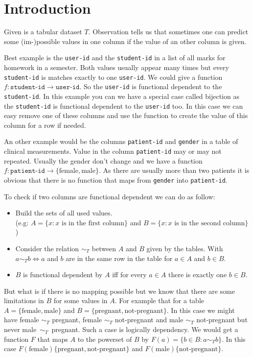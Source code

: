 \documentclass[a4paper]{article}
\begin{document}
\section{Introduction}
Given is a tabular dataset $T$.
Observation tells us that sometimes one can predict some (im-)possible values in one column if the value of an other column is given.

Best example is the \texttt{user-id} and the \texttt{student-id} in a list of all marks for homework in a semester.
Both values usually appear many times but every \texttt{student-id} is matches exactly to one \texttt{user-id}.
We could give a function $f : \texttt{student-id} \to \texttt{user-id}$.
So the \texttt{user-id} is functional dependent to the \texttt{student-id}.
In this example you can we have a special case called bijection as the \texttt{student-id} is functional dependent to the \texttt{user-id} too.
In this case we can easy remove one of these columns and use the function to create the value of this column for a row if needed.

An other example would be the columns \texttt{patient-id} and \texttt{gender} in a table of clinical measurements. 
Value in the column \texttt{patient-id} may or may not repeated.
Usually the gender don't change and we have a function $f : \texttt{patient-id} \to \{ \mbox{female}, \mbox{male} \}$.
As there are usually more than two patients it is obvious that there is no function that maps from \texttt{gender} into \texttt{patient-id}. 

To check if two columns are functional dependent we can do as follow:
\begin{itemize}
\item Build the sets of all used values.\\ (e.g: $A = \{ x : x \mbox{ is in the first column} \}$ and $B = \{ x : x \mbox{ is in the second column} \}$)
\item Consider the relation $\sim_T$ between $A$ and $B$ given by the tables. With $a \sim_T b \Leftrightarrow a$ and $b$ are in the same row in the table for $a \in A$ and $b \in B$.
\item $B$ is functional dependent by $A$ iff for every $a \in A$ there is exactly one $b \in B$.
\end{itemize}

But what is if there is no mapping possible but we know that there are some limitations in $B$ for some values in $A$.
For example that for a table $A = \{ \mbox{female}, \mbox{male} \}$ and $B = \{ \mbox{pregnant}, \mbox{not-pregnant} \}$.
In this case we might have female $\sim_T$ pregnant, female $\sim_T$ not-pregnant and male $\sim_T$ not-pregnant but never \mbox{male $\sim_T$ pregnant}.
Such a case is logically dependency.
We would get a function $F$ that maps $A$ to the powerset of $B$ by $F(a) = \{ b \in B : a \sim_T b \}$. 
In this case $F(\mbox{female}) \{ \mbox{pregnant}, \mbox{not-pregnant} \}$ and $F(\mbox{male}) \{ \mbox{not-pregnant} \}$.
\end{document}
